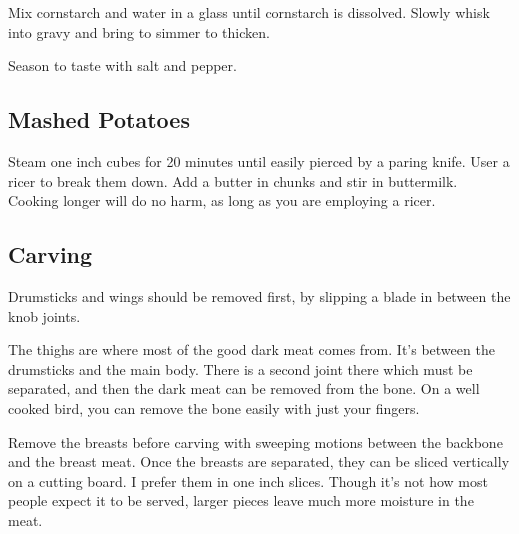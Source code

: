 \begin{recipe}
Mix cornstarch and water in a glass until cornstarch is dissolved. Slowly whisk into gravy and bring to simmer to thicken.

Season to taste with salt and pepper.

\subsection{Mashed Potatoes}



Steam one inch cubes for 20 minutes until easily pierced by a paring knife. User a ricer to break them down. Add a butter in chunks and stir in buttermilk. Cooking longer will do no harm, as long as you are employing a ricer.

\newpage
\subsection{Carving}

Drumsticks and wings should be removed first, by slipping a blade in between the knob joints.

The thighs are where most of the good dark meat comes from. It's between the drumsticks and the main body. There is a second joint there which must be separated, and then the dark meat can be removed from the bone. On a well cooked bird, you can remove the bone easily with just your fingers.

Remove the breasts before carving with sweeping motions between the backbone and the breast meat.
Once the breasts are separated, they can be sliced vertically on a cutting board.
I prefer them in one inch slices.
Though it's not how most people expect it to be served, larger pieces leave much more moisture in the meat.

\end{recipe}
